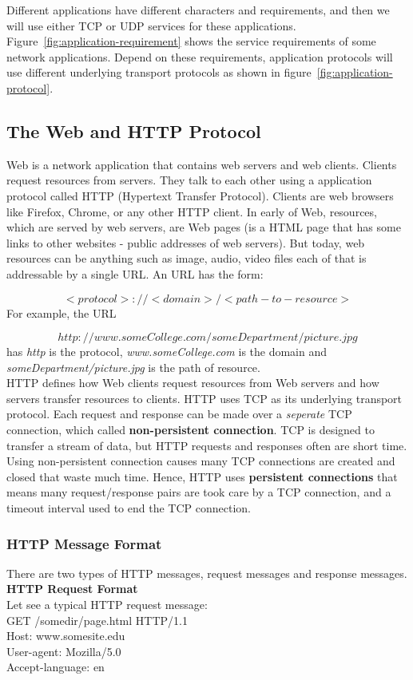 \documentclass[a4paper, 11pt]{article}
\begin{document}
Different applications have different characters and requirements, and then we will use either TCP or UDP services for these applications. Figure~\ref{fig:application-requirement} shows the service requirements of some network applications. Depend on these requirements, application protocols will use different underlying transport protocols as shown in figure~\ref{fig:application-protocol}.

\subsection{The Web and HTTP Protocol}
Web is a network application that contains web servers and web clients. Clients request resources from servers. They talk to each other using a application protocol called HTTP (Hypertext Transfer Protocol). Clients are web browsers like Firefox, Chrome, or any other HTTP client. In early of Web, resources, which are served by web servers, are Web pages (is a HTML page that has some links to other websites - public addresses of web servers). But today, web resources can be anything such as image, audio, video files each of that is addressable by a single URL. An URL has the form:

\[<protocol>://<domain>/<path-to-resource>\]
For example, the URL

\[http://www.someCollege.com/someDepartment/picture.jpg\]
has \textit{http} is the protocol, \textit{www.someCollege.com} is the domain and \textit{someDepartment/picture.jpg} is the path of resource.\\

HTTP defines how Web clients request resources from Web servers and how servers transfer resources to clients. HTTP uses TCP as its underlying transport protocol. Each request and response can be made over a \textit{seperate} TCP connection, which called \textbf{non-persistent connection}. TCP is designed to transfer a stream of data, but HTTP requests and responses often are short time. Using non-persistent connection causes many TCP connections are created and closed that waste much time. Hence, HTTP uses \textbf{persistent connections} that means many request/response pairs are took care by a TCP connection, and a timeout interval used to end the TCP connection.\\

\subsubsection{HTTP Message Format}
There are two types of HTTP messages, request messages and response messages.\\
\textbf{HTTP Request Format}\\
Let see a typical HTTP request message:\\
{\ttfamily
GET /somedir/page.html HTTP/1.1 \\
Host: www.somesite.edu \\
User-agent: Mozilla/5.0 \\
Accept-language: en} \\
\end{document}
